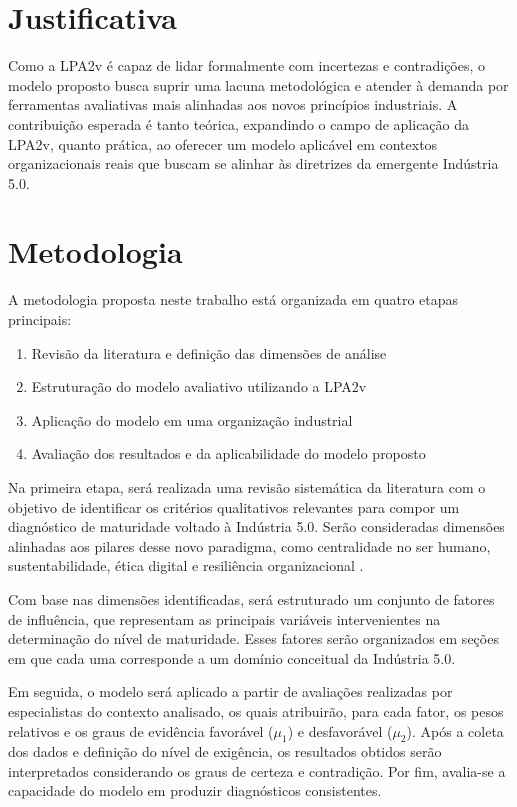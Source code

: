 \section{Justificativa}

Como a \gls{LPA2v} é capaz  de lidar formalmente com incertezas e contradições, o modelo proposto busca suprir uma lacuna metodológica e atender à demanda por ferramentas avaliativas mais alinhadas aos novos princípios industriais.
A contribuição esperada é tanto teórica, expandindo o campo de aplicação da \gls{LPA2v}, quanto prática, ao oferecer um modelo aplicável em contextos organizacionais reais que buscam se alinhar às diretrizes da emergente Indústria 5.0.

\section{Metodologia}

A metodologia proposta neste trabalho está organizada em quatro etapas principais:
\begin{enumerate}[label=\roman*.]
    \item Revisão da literatura e definição das dimensões de análise
    \item Estruturação do modelo avaliativo utilizando a \gls{LPA2v}
    \item Aplicação do modelo em uma organização industrial
    \item Avaliação dos resultados e da aplicabilidade do modelo proposto
\end{enumerate}

Na primeira etapa, será realizada uma revisão sistemática da literatura com o objetivo de identificar os critérios qualitativos relevantes para compor um diagnóstico de maturidade voltado à Indústria 5.0.
Serão consideradas dimensões alinhadas aos pilares desse novo paradigma, como centralidade no ser humano, sustentabilidade, ética digital e resiliência organizacional \cite{euCommission2021}.

Com base nas dimensões identificadas, será estruturado um conjunto de fatores de influência, que representam as principais variáveis intervenientes na determinação do nível de maturidade.
Esses fatores serão organizados em seções em que cada uma corresponde a um domínio conceitual da Indústria 5.0. 

Em seguida, o modelo será aplicado a partir de avaliações realizadas por especialistas do contexto analisado, os quais atribuirão, para cada fator, os pesos relativos e os graus de evidência favorável ($\mu_1$) e desfavorável ($\mu_2$).
Após a coleta dos dados e definição do nível de exigência, os resultados obtidos serão interpretados considerando os graus de certeza e contradição. Por fim, avalia-se a capacidade do modelo em produzir diagnósticos consistentes.


